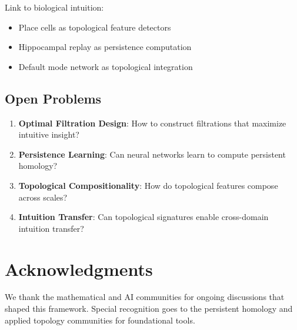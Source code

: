 \documentclass[11pt]{article}
\begin{document}
Link to biological intuition:
\begin{itemize}
    \item Place cells as topological feature detectors
    \item Hippocampal replay as persistence computation
    \item Default mode network as topological integration
\end{itemize}

\subsection{Open Problems}

\begin{enumerate}
    \item \textbf{Optimal Filtration Design}: How to construct filtrations that maximize intuitive insight?
    \item \textbf{Persistence Learning}: Can neural networks learn to compute persistent homology?
    \item \textbf{Topological Compositionality}: How do topological features compose across scales?
    \item \textbf{Intuition Transfer}: Can topological signatures enable cross-domain intuition transfer?
\end{enumerate}

\section*{Acknowledgments}

We thank the mathematical and AI communities for ongoing discussions that shaped this framework. Special recognition goes to the persistent homology and applied topology communities for foundational tools.



\end{document}
